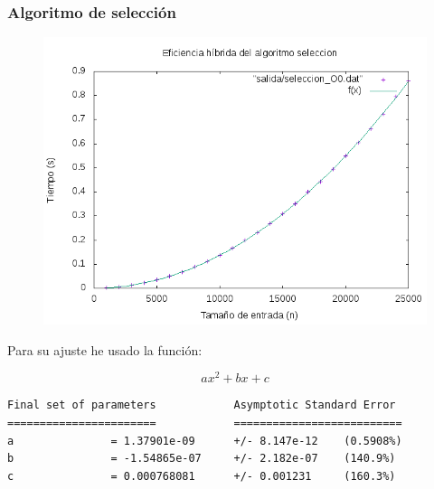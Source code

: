 \documentclass[spanish]{beamer}
\begin{document}
\begin{frame}\frametitle{Algoritmo de selección}
  \begin{figure}[H]
    \centering   
        \includegraphics[clip,width=1\columnwidth]{../../plots/seleccion_O0_fit.png}%
    \end{figure}
  \end{frame}

\begin{frame}[fragile]
  Para su ajuste he usado la función:

  $$ax^2+bx+c$$
  
\scriptsize
\begin{verbatim}
Final set of parameters            Asymptotic Standard Error
=======================            ==========================
a               = 1.37901e-09      +/- 8.147e-12    (0.5908%)
b               = -1.54865e-07     +/- 2.182e-07    (140.9%)
c               = 0.000768081      +/- 0.001231     (160.3%)
\end{verbatim}
  
  
\end{frame}

%
%
\end{document}
